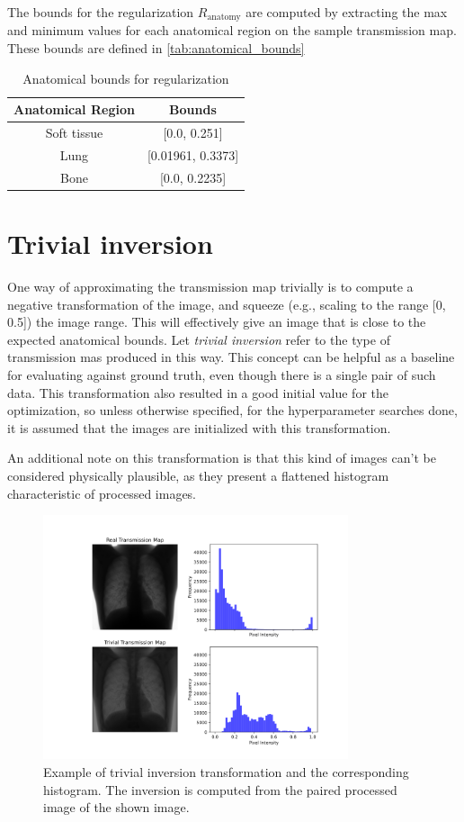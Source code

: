 \documentclass[nomenclature, english, bibtex]{kththesis}
\numberwithin{listing}{chapter}
\begin{document}
The bounds for the regularization $R_{\text{anatomy}}$ are computed by extracting the max and minimum values
for each anatomical region on the sample transmission map. These bounds are defined in \autoref{tab:anatomical_bounds}

\begin{table}
\centering
\begin{tabular}{|c|c|}
    \hline
    Anatomical Region & Bounds \\
    \hline
    Soft tissue & [0.0, 0.251] \\
    Lung & [0.01961, 0.3373] \\
    Bone & [0.0, 0.2235] \\
    \hline
\end{tabular}
\label{tab:anatomical_bounds}
\caption{Anatomical bounds for regularization}
\end{table}

\section{Trivial inversion}

One way of approximating the transmission map trivially is to compute a negative transformation of the image,
and squeeze (e.g., scaling to the range [0, 0.5]) the image range. This will effectively give an image that is close to the expected
anatomical bounds. Let \textit{trivial inversion} refer to the type of transmission mas produced in this way. This concept can
be helpful as a baseline for evaluating against ground truth, even though there is a single pair of such data. This transformation
also resulted in a good initial value for the optimization, so unless otherwise specified, for the hyperparameter searches done,
it is assumed that the images are initialized with this transformation.

An additional note on this transformation is that this kind of images can't be considered physically plausible, as they present
a flattened histogram characteristic of processed images.

\begin{figure}[h]
    \centering
    \includegraphics[width=0.8\textwidth]{figures/trivial_histogram.png}
    \caption{Example of trivial inversion transformation and the corresponding histogram. The inversion is computed
    from the paired processed image of the shown image.}
    \label{fig:trivial_inversion}
\end{figure}
\end{document}
